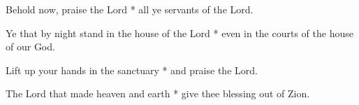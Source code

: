\begin{multicols}{2}
	
	Behold now, praise the Lord * all ye servants of the Lord.
	
	Ye that by night stand in the house of the Lord * even in the courts of the house of our God.
	
	Lift up your hands in the sanctuary  * and praise the Lord.
	
	The Lord that made heaven and earth * give thee blessing out of Zion.
	
	\gloria{}
\end{multicols}